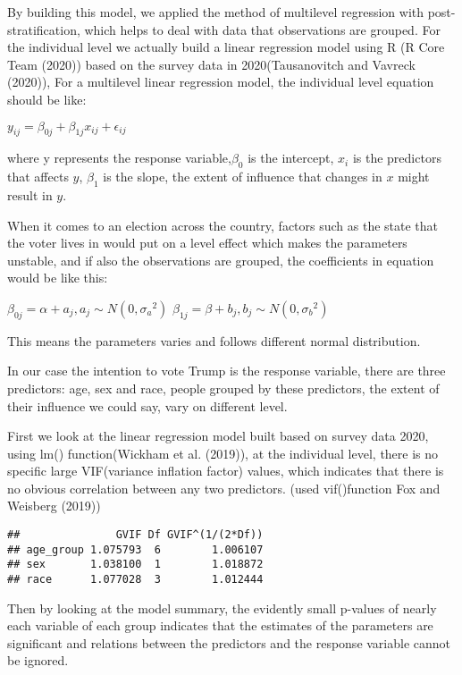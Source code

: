 \documentclass[
]{article}
\begin{document}
By building this model, we applied the method of multilevel regression
with post-stratification, which helps to deal with data that
observations are grouped. For the individual level we actually build a
linear regression model using R (R Core Team (2020)) based on the survey
data in 2020(Tausanovitch and Vavreck (2020)), For a multilevel linear
regression model, the individual level equation should be like:

\(y_{ij} = \beta_{0j} + \beta_{1j}x_{ij} + \epsilon_{ij}\)

where y represents the response variable,\(\beta_0\) is the intercept,
\(x_i\) is the predictors that affects \(y\), \(\beta_1\) is the slope,
the extent of influence that changes in \(x\) might result in \(y\).

When it comes to an election across the country, factors such as the
state that the voter lives in would put on a level effect which makes
the parameters unstable, and if also the observations are grouped, the
coefficients in equation would be like this:

\(\beta_{0j} = \alpha + a_j, a_j \sim N(0, {\sigma_a}^2)\)
\(\beta_{1j} = \beta + b_j, b_j \sim N(0, {\sigma_b}^2)\)

This means the parameters varies and follows different normal
distribution.

In our case the intention to vote Trump is the response variable, there
are three predictors: age, sex and race, people grouped by these
predictors, the extent of their influence we could say, vary on
different level.

First we look at the linear regression model built based on survey data
2020, using lm() function(Wickham et al. (2019)), at the individual
level, there is no specific large VIF(variance inflation factor) values,
which indicates that there is no obvious correlation between any two
predictors. (used vif()function Fox and Weisberg (2019))

\begin{verbatim}
##               GVIF Df GVIF^(1/(2*Df))
## age_group 1.075793  6        1.006107
## sex       1.038100  1        1.018872
## race      1.077028  3        1.012444
\end{verbatim}

Then by looking at the model summary, the evidently small p-values of
nearly each variable of each group indicates that the estimates of the
parameters are significant and relations between the predictors and the
response variable cannot be ignored.
\end{document}

